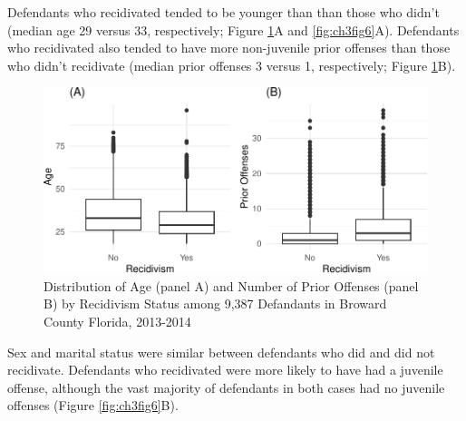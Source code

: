 \documentclass[12pt, twoside]{amherstthesis}
\begin{document}
Defendants who recidivated tended to be younger than than those who didn't (median age 29 versus 33, respectively; Figure \ref{fig:ch3fig5}A and \ref{fig:ch3fig6}A). Defendants who recidivated also tended to have more non-juvenile prior offenses than those who didn't recidivate (median prior offenses 3 versus 1, respectively; Figure \ref{fig:ch3fig5}B).
\begin{figure}

{\centering \includegraphics{Dasha-Asienga_StatThesis_files/figure-latex/ch3fig5-1} 

}

\caption{Distribution of Age (panel A) and Number of Prior Offenses (panel B) by Recidivism Status among 9,387 Defandants in Broward County Florida, 2013-2014}\label{fig:ch3fig5}
\end{figure}
Sex and marital status were similar between defendants who did and did not recidivate. Defendants who recidivated were more likely to have had a juvenile offense, although the vast majority of defendants in both cases had no juvenile offenses (Figure \ref{fig:ch3fig6}B).
\end{document}
